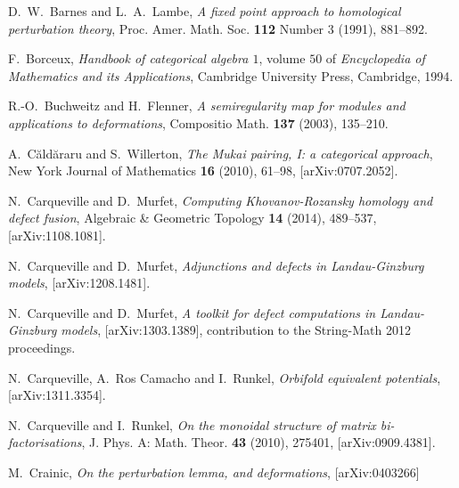 \documentclass[english,letter paper,12pt,leqno]{article}
\theoremstyle{example}
\numberwithin{equation}{section}
\begin{document}

\providecommand{\bysame}{\leavevmode\hbox to3em{\hrulefill}\thinspace}
\providecommand{\href}[2]{#2}
\begin{thebibliography}{BHLS03}


D.~W.~Barnes and L.~A.~Lambe, \emph{A fixed point approach to homological perturbation theory}, Proc. Amer.
  Math. Soc. \textbf{112} Number 3 (1991), 881--892.

F.~Borceux, \textsl{Handbook of categorical algebra $1$}, volume $50$ of \textsl{Encyclopedia of Mathematics and its Applications}, Cambridge University Press, Cambridge, 1994.

R.-O.~Buchweitz and H.~Flenner, \textsl{A semiregularity map for modules and applications to deformations}, Compositio Math. \textbf{137} (2003), 135--210.
    
A.~{C\u ald\u araru} and S.~Willerton, \textsl{The Mukai pairing, I: a categorical approach},
New York Journal of Mathematics \textbf{16} (2010), 61--98, 
  \href{http://arxiv.org/abs/0707.2052}{[arXiv:0707.2052]}.

N.~Carqueville and D.~Murfet, \textsl{Computing {K}hovanov-{R}ozansky homology and defect fusion}, Algebraic \& Geometric Topology \textbf{14} (2014), 489--537, \href{http://arxiv.org/abs/1108.1081}{[arXiv:1108.1081]}. 

N.~Carqueville and D.~Murfet, \textsl{Adjunctions and defects in {L}andau-{G}inzburg models}, \href{http://arxiv.org/abs/1208.1481}{[arXiv:1208.1481]}.

N.~Carqueville and D.~Murfet, \textsl{A toolkit for defect computations in Landau-Ginzburg models}, \href{http://arxiv.org/abs/1303.1389}{[arXiv:1303.1389]}, contribution to the String-Math 2012 proceedings.

N.~Carqueville, A.~Ros Camacho and I.~Runkel, \textsl{Orbifold equivalent potentials}, \href{http://arxiv.org/abs/1311.3354}{[arXiv:1311.3354]}.

N.~Carqueville and I.~Runkel, \textsl{On the monoidal structure of matrix bi-factorisations}, J. Phys.
  A: Math. Theor. \textbf{43} (2010), 275401,
  \href{http://arxiv.org/abs/0909.4381}{[arXiv:0909.4381]}.
  
M.~Crainic, \emph{On the perturbation lemma, and deformations}, \href{http://arxiv.org/abs/math/0403266}{[arXiv:0403266]}


\end{thebibliography}
\end{document}
